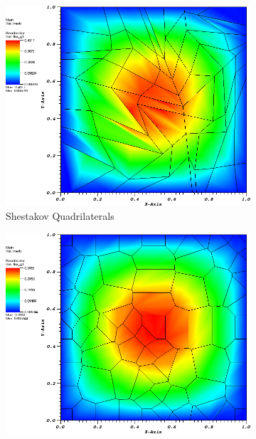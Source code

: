 \begin{figure}
{\begin{subfigure}[b]{0.465\textwidth}
	\end{subfigure}
}
{
	\vspace{3mm}
	\begin{subfigure}[b]{0.465\textwidth}
		\centering
		\label{subfig::x2y2_shes_quad_me_k2_lin_sol}
		\includegraphics[width=\textwidth]{figures/sec_BF/x2y2Sol_ShesQuad_ME2.png}
		\caption{Shestakov Quadrilaterals}
	\end{subfigure}
	\hfill
	\begin{subfigure}[b]{0.465\textwidth}
		\centering
		\label{subfig::x2y2_smooth_poly_me_k2_lin_sol}
		\includegraphics[width=\textwidth]{figures/sec_BF/x2y2Sol_SinePoly_ME2.png}

\end{subfigure}}
\end{figure}
